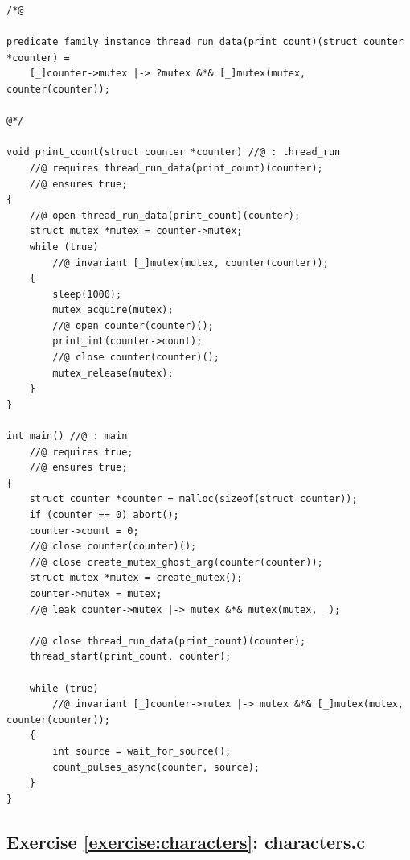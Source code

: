 \documentclass{article}
\begin{document}
\begin{lstlisting}
/*@

predicate_family_instance thread_run_data(print_count)(struct counter *counter) =
    [_]counter->mutex |-> ?mutex &*& [_]mutex(mutex, counter(counter));

@*/

void print_count(struct counter *counter) //@ : thread_run
    //@ requires thread_run_data(print_count)(counter);
    //@ ensures true;
{
    //@ open thread_run_data(print_count)(counter);
    struct mutex *mutex = counter->mutex;
    while (true)
        //@ invariant [_]mutex(mutex, counter(counter));
    {
        sleep(1000);
        mutex_acquire(mutex);
        //@ open counter(counter)();
        print_int(counter->count);
        //@ close counter(counter)();
        mutex_release(mutex);
    }
}

int main() //@ : main
    //@ requires true;
    //@ ensures true;
{
    struct counter *counter = malloc(sizeof(struct counter));
    if (counter == 0) abort();
    counter->count = 0;
    //@ close counter(counter)();
    //@ close create_mutex_ghost_arg(counter(counter));
    struct mutex *mutex = create_mutex();
    counter->mutex = mutex;
    //@ leak counter->mutex |-> mutex &*& mutex(mutex, _);

    //@ close thread_run_data(print_count)(counter);
    thread_start(print_count, counter);

    while (true)
        //@ invariant [_]counter->mutex |-> mutex &*& [_]mutex(mutex, counter(counter));
    {
        int source = wait_for_source();
        count_pulses_async(counter, source);
    }
}
\end{lstlisting}

\subsection{Exercise \ref{exercise:characters}: characters.c}\label{solution:characters}
\end{document}

